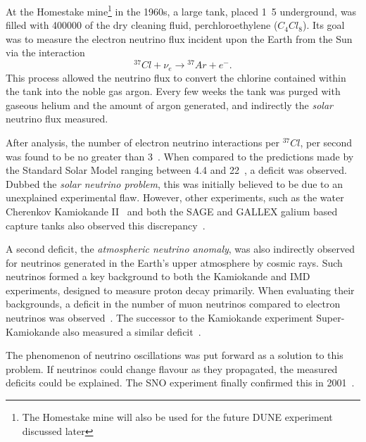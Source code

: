 At the Homestake mine\footnote{The Homestake mine will also be used for the future DUNE experiment
    discussed later} in the 1960s, a large tank, placed \unit{1.5}{} underground, was
filled with \unit{400000}{\litre} of the dry cleaning fluid, perchloroethylene
($C_{4}Cl_{8}$). Its goal was to measure the electron neutrino flux incident upon the Earth
from the Sun via the interaction
\begin{equation} %
    {}^{37}Cl+\nu_{e}\rightarrow{}^{37}Ar+e^{-}.
\end{equation} %
This process allowed the neutrino flux to convert the chlorine contained within the tank into the
noble gas argon. Every few weeks the tank was purged with gaseous helium and the amount of argon
generated, and indirectly the \emph{solar} neutrino flux measured.

After analysis, the number of electron neutrino interactions per ${}^{37}Cl$, per second was found
to be no greater than 3~\cite{davis1968}. When compared to the predictions made by the Standard
Solar Model ranging between 4.4 and 22~\cite{bahcall1968}, a deficit was observed. Dubbed the
\emph{solar neutrino problem}, this was initially believed to be due to an unexplained
experimental flaw. However, other experiments, such as the water Cherenkov Kamiokande
II~\cite{hirata1989} and both the SAGE and GALLEX galium based capture tanks also observed this
discrepancy~\cite{abazov1991,anselmann1994}.

A second deficit, the \emph{atmospheric neutrino anomaly}, was also indirectly observed for
neutrinos generated in the Earth's upper atmosphere by cosmic rays. Such neutrinos formed a key
background to both the Kamiokande and IMD experiments, designed to measure proton decay primarily.
When evaluating their backgrounds, a deficit in the number of muon neutrinos compared to electron
neutrinos was observed~\cite{hirata1988, becker1992}. The successor to the Kamiokande experiment
Super-Kamiokande also measured a similar deficit~\cite{kajita1999}.

The phenomenon of neutrino oscillations was put forward as a solution to this problem. If
neutrinos could change flavour as they propagated, the measured deficits could be explained. The
SNO experiment finally confirmed this in 2001~\cite{ahmad2002}.

